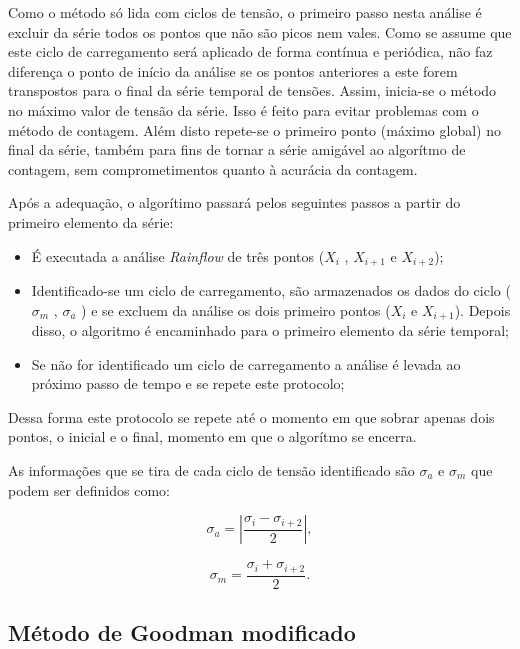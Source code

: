Como o método só lida com ciclos de tensão, o primeiro passo nesta análise é excluir da série todos os pontos que não são picos nem vales. Como se assume que este ciclo de carregamento será aplicado de forma contínua e periódica, não faz diferença o ponto de início da análise se os pontos anteriores a este forem transpostos para o final da série temporal de tensões. Assim, inicia-se o método no máximo valor de tensão da série. Isso é feito para evitar problemas com o método de contagem. Além disto repete-se o primeiro ponto (máximo global) no final da série, também para fins de tornar a série amigável ao algorítmo de contagem, sem comprometimentos quanto à acurácia da contagem.

Após a adequação, o algorítimo passará pelos seguintes passos a partir do primeiro elemento da série:
\begin{itemize}
    \item É executada a análise \emph{Rainflow} de três pontos ($X_i$ , $X_{i+1}$ e $X_{i+2}$);
    \item Identificado-se um ciclo de carregamento, são armazenados os dados do ciclo ( $\sigma_{m}$ , $\sigma_{a}$ ) e se excluem da análise os dois primeiro pontos ($X_i$ e $X_{i+1}$). Depois disso, o algoritmo é encaminhado para o primeiro elemento da série temporal;
    \item Se não for identificado um ciclo de carregamento a análise é levada ao próximo passo de tempo e se repete este protocolo;    
\end{itemize}

Dessa forma este protocolo se repete até o momento em que sobrar apenas dois pontos, o inicial e o final, momento em que o algorítmo se encerra.
 
As informações que se tira de cada ciclo de tensão identificado são $\sigma_{a}$ e $\sigma_{m}$ que podem ser definidos como:

\begin{equation}\label{eq.1}
    \sigma_a = \left| \frac{\sigma_{i} - \sigma_{i+2}}{2} \right|,
\end{equation}

\begin{equation}\label{eq.2}
    \sigma_m = \frac{\sigma_{i} + \sigma_{i+2}}{2}.
\end{equation}

\subsection{Método de Goodman modificado}

